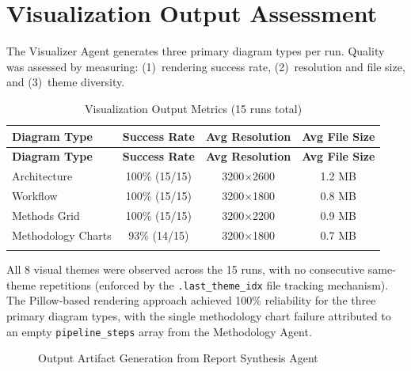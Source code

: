 \documentclass[a4paper,12pt,openany]{report}
\begin{document}
\section{Visualization Output Assessment}

The Visualizer Agent generates three primary diagram types per run. Quality was assessed by measuring: (1)~rendering success rate, (2)~resolution and file size, and (3)~theme diversity.

\begin{longtable}{|l|c|c|c|}
\hline
\textbf{Diagram Type} & \textbf{Success Rate} & \textbf{Avg Resolution} & \textbf{Avg File Size} \\
\hline
\endfirsthead
\hline
\textbf{Diagram Type} & \textbf{Success Rate} & \textbf{Avg Resolution} & \textbf{Avg File Size} \\
\hline
\endhead
\hline
\endfoot
Architecture & 100\% (15/15) & 3200$\times$2600 & 1.2 MB \\
\hline
Workflow & 100\% (15/15) & 3200$\times$1800 & 0.8 MB \\
\hline
Methods Grid & 100\% (15/15) & 3200$\times$2200 & 0.9 MB \\
\hline
Methodology Charts & 93\% (14/15) & 3200$\times$1800 & 0.7 MB \\
\hline

\caption{Visualization Output Metrics (15 runs total)}
\label{tab:viz_metrics}
\end{longtable}

All 8 visual themes were observed across the 15 runs, with no consecutive same-theme repetitions (enforced by the \texttt{.last\_theme\_idx} file tracking mechanism). The Pillow-based rendering approach achieved 100\% reliability for the three primary diagram types, with the single methodology chart failure attributed to an empty \texttt{pipeline\_steps} array from the Methodology Agent.

\begin{figure}[H]
\centering
{}
\caption{Output Artifact Generation from Report Synthesis Agent}
\label{fig:output_artifacts}
\end{figure}
\end{document}
